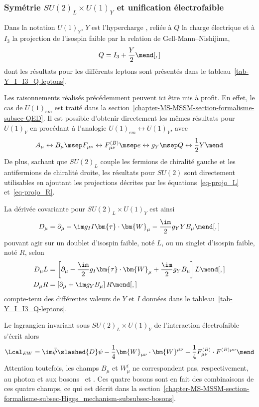 \subsubsection{Symétrie $SU(2)_L \times U(1)_Y$ et unification électrofaible}\label{chapter-MS-MSSM-section-formalisme-subsec-EW-U1}
Dans la notation $U(1)_Y$, $Y$ est l'\og hypercharge \fg, reliée à $Q$ la charge électrique et à $I_3$ la projection de l'isospin faible par la relation de Gell-Mann--Nishijima,
\begin{equation}
Q = I_3 + \frac{Y}{2}
\mend[,]
\end{equation}
dont les résultats pour les différents leptons sont présentés dans le tableau~\ref{tab-Y_I_I3_Q-leptons}.
\par Les raisonnements réalisés précédemment peuvent ici être mis à profit. En effet, le cas de $U(1)_{em}$ est traité dans la section~\ref{chapter-MS-MSSM-section-formalisme-subsec-QED}. Il est possible d'obtenir directement les mêmes résultats pour $U(1)_Y$ en procédant à l'analogie $U(1)_{em}\leftrightarrow U(1)_Y$, avec
\begin{equation}
A_\mu \leftrightarrow B_\mu
\msep
F_{\mu\nu} \leftrightarrow F^{(B)}_{\mu\nu}
\msep
e \leftrightarrow g_Y
\msep
Q \leftrightarrow \frac{1}{2}Y
\mend
\end{equation}
De plus, sachant que $SU(2)_L$ couple les fermions de chiralité gauche et les antifermions de chiralité droite, les résultats pour $SU(2)$ sont directement utilisables en ajoutant les projections décrites par les équations~\eqref{eq-projo_L} et~\eqref{eq-projo_R}.
\par La dérivée covariante pour $SU(2)_L \times U(1)_Y$ est ainsi
\begin{equation}
D_\mu = \partial_\mu - \im g_II \bm{\tau}\cdot\bm{W}_\mu - \frac{\im}{2}g_YYB_\mu
\mend[,]
\label{eq-definition_Dmu_EW}
\end{equation}
pouvant agir sur un doublet d'isospin faible, noté $L$, ou un singlet d'isospin faible, noté $R$, selon
\begin{align}
D_\mu L &= \left[ \partial_\mu - \frac{\im}{2}g_I \bm{\tau}\cdot\bm{W}_\mu + \frac{\im}{2}g_YB_\mu \right] L
\mend[,]
\\
D_\mu R &= \left[ \partial_\mu + \im g_YB_\mu \right] R
\mend[,]
\end{align}
compte-tenu des différentes valeurs de $Y$ et $I$ données dans le tableau~\ref{tab-Y_I_I3_Q-leptons}.
\par Le lagrangien invariant sous $SU(2)_L\times U(1)_Y$ de l'interaction électrofaible s'écrit alors
\begin{equation}
\Lcal_{EW}
=
\im \bar{\psi} \slashed{D} \psi - \frac{1}{4} \bm{W}_{\mu\nu} \cdot \bm{W}^{\mu\nu} - \frac{1}{4} F^{(B)}_{\mu\nu} \cdot F^{(B)\mu\nu}
\mend
\label{eq-chapter-MS-MSSM-section-formalisme-subsec-EW-LSU2LU1Y}
\end{equation}
Attention toutefois, les champs $B_\mu$ et $W^i_\mu$ ne correspondent pas, respectivement, au photon et aux bosons \Wbosonpm\ et \Zboson.
Ces quatre bosons sont en fait des combinaisons de ces quatre champs, ce qui est décrit dans la section~\ref{chapter-MS-MSSM-section-formalisme-subsec-Higgs_mechanism-subsubsec-bosons}.

